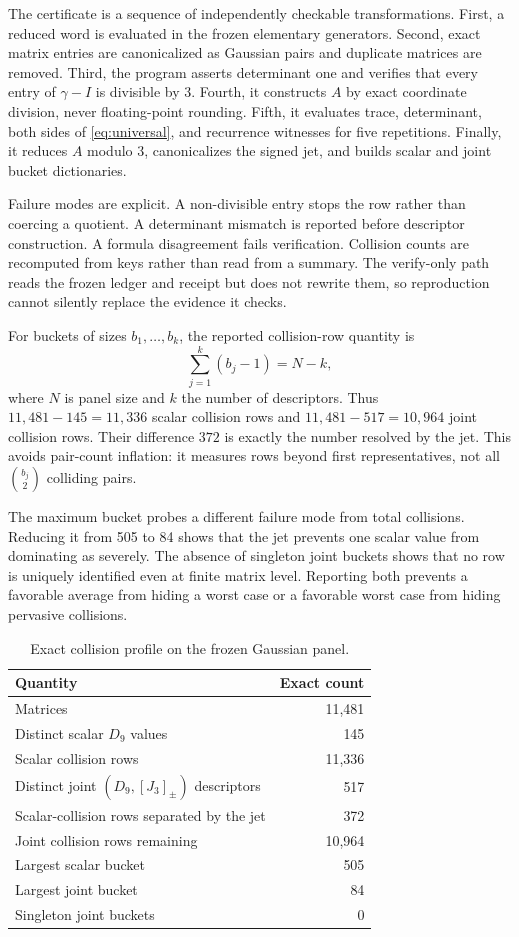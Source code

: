 \documentclass[11pt,a4paper]{article}
\theoremstyle{definition}
\theoremstyle{remark}
\begin{document}
The certificate is a sequence of independently checkable transformations. First, a reduced word is evaluated in the frozen elementary generators. Second, exact matrix entries are canonicalized as Gaussian pairs and duplicate matrices are removed. Third, the program asserts determinant one and verifies that every entry of \(\gamma-I\) is divisible by \(3\). Fourth, it constructs \(A\) by exact coordinate division, never floating-point rounding. Fifth, it evaluates trace, determinant, both sides of \cref{eq:universal}, and recurrence witnesses for five repetitions. Finally, it reduces \(A\) modulo \(3\), canonicalizes the signed jet, and builds scalar and joint bucket dictionaries.

Failure modes are explicit. A non-divisible entry stops the row rather than coercing a quotient. A determinant mismatch is reported before descriptor construction. A formula disagreement fails verification. Collision counts are recomputed from keys rather than read from a summary. The verify-only path reads the frozen ledger and receipt but does not rewrite them, so reproduction cannot silently replace the evidence it checks.

For buckets of sizes \(b_1,\ldots,b_k\), the reported collision-row quantity is
\[
 \sum_{j=1}^k(b_j-1)=N-k,
\]
where \(N\) is panel size and \(k\) the number of descriptors. Thus \(11{,}481-145=11{,}336\) scalar collision rows and \(11{,}481-517=10{,}964\) joint collision rows. Their difference \(372\) is exactly the number resolved by the jet. This avoids pair-count inflation: it measures rows beyond first representatives, not all \(\binom{b_j}{2}\) colliding pairs.

The maximum bucket probes a different failure mode from total collisions. Reducing it from 505 to 84 shows that the jet prevents one scalar value from dominating as severely. The absence of singleton joint buckets shows that no row is uniquely identified even at finite matrix level. Reporting both prevents a favorable average from hiding a worst case or a favorable worst case from hiding pervasive collisions.

\begin{table}[t]
\centering
\caption{Exact collision profile on the frozen Gaussian panel.}
\label{tab:collision}
\begin{tabular}{lr}
\toprule
Quantity & Exact count \\
\midrule
Matrices & 11,481 \\
Distinct scalar \(D_9\) values & 145 \\
Scalar collision rows & 11,336 \\
Distinct joint \((D_9,[J_3]_{\pm})\) descriptors & 517 \\
Scalar-collision rows separated by the jet & 372 \\
Joint collision rows remaining & 10,964 \\
Largest scalar bucket & 505 \\
Largest joint bucket & 84 \\
Singleton joint buckets & 0 \\
\bottomrule
\end{tabular}
\end{table}
\end{document}
